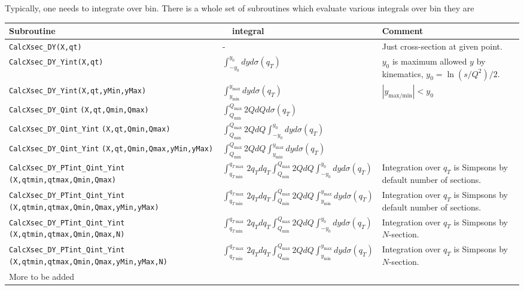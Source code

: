 \documentclass[prd,nofootinbib,eqsecnum,final]{revtex4}
\renewcommand{\(}{\left(}
\renewcommand{\)}{\right)}
\renewcommand{\[}{\left[}
\renewcommand{\]}{\right]}
\newcommand{\red}[1]{{\color[rgb]{1,0,0} #1}}
\begin{document}
Typically, one needs to integrate over bin. There is a whole set of subroutines which evaluate various integrals over bin they are
\begin{center}
\begin{tabular}{||p{7cm}|l||p{4cm}||}
\hline\hline
Subroutine & ~~integral~~&  Comment
\\\hline
\texttt{CalcXsec\_DY(X,qt)} & - & Just cross-section at given point.
\\\hline
\texttt{CalcXsec\_DY{\_}Yint(X,qt)} & $\int_{-y_{0}}^{y_{0}}dy d\sigma(q_T)$ & $y_0$ is maximum allowed $y$ by kinematics, $y_0=\ln(s/Q^2)/2$.
\\\hline
\texttt{CalcXsec\_DY{\_}Yint(X,qt,yMin,yMax)} & $\int_{y_{\min}}^{y_{\max}}dy d\sigma(q_T)$ & $|y_{\text{max/min}}|<y_0$ 
\\\hline
\texttt{CalcXsec\_DY{\_}Qint} \texttt{(X,qt,Qmin,Qmax)} & $\int_{Q_\text{min}}^{Q_{\text{max}}} 2QdQ  d\sigma(q_T)$ & 
\\\hline
\texttt{CalcXsec\_DY{\_}Qint{\_}Yint} \texttt{(X,qt,Qmin,Qmax)} & $\int_{Q_\text{min}}^{Q_{\text{max}}} 2QdQ  \int_{-y_{0}}^{y_{0}}dy d\sigma(q_T)$ & 
\\\hline
\texttt{CalcXsec\_DY{\_}Qint{\_}Yint} \texttt{(X,qt,Qmin,Qmax,yMin,yMax)} & $\int_{Q_\text{min}}^{Q_{\text{max}}} 2QdQ \int_{y_{\min}}^{y_{\max}}dy d\sigma(q_T)$ & 
\\\hline
\texttt{CalcXsec\_DY{\_}PTint{\_}Qint{\_}Yint} \texttt{(X,qtmin,qtmax,Qmin,Qmax)} & $\int_{q_{T\min}}^{q_{T\max}}2q_Tdq_T\int_{Q_\text{min}}^{Q_{\text{max}}} 2QdQ  \int_{-y_{0}}^{y_{0}}dy d\sigma(q_T)$ & Integration over $q_T$ is Simpsons by default number of sections.
\\\hline
\texttt{CalcXsec\_DY{\_}PTint{\_}Qint{\_}Yint} \texttt{(X,qtmin,qtmax,Qmin,Qmax,yMin,yMax)} & $\int_{q_{T\min}}^{q_{T\max}}2q_Tdq_T\int_{Q_\text{min}}^{Q_{\text{max}}} 2QdQ \int_{y_{\min}}^{y_{\max}}dy d\sigma(q_T)$ & Integration over $q_T$ is Simpsons by default number of sections.
\\\hline
\texttt{CalcXsec\_DY{\_}PTint{\_}Qint{\_}Yint} \texttt{(X,qtmin,qtmax,Qmin,Qmax,N)} & $\int_{q_{T\min}}^{q_{T\max}}2q_Tdq_T\int_{Q_\text{min}}^{Q_{\text{max}}} 2QdQ  \int_{-y_{0}}^{y_{0}}dy d\sigma(q_T)$ & Integration over $q_T$ is Simpsons by $N$-section.
\\\hline
\texttt{CalcXsec\_DY{\_}PTint{\_}Qint{\_}Yint} \texttt{(X,qtmin,qtmax,Qmin,Qmax,yMin,yMax,N)} & $\int_{q_{T\min}}^{q_{T\max}}2q_Tdq_T\int_{Q_\text{min}}^{Q_{\text{max}}} 2QdQ \int_{y_{\min}}^{y_{\max}}dy d\sigma(q_T)$ & Integration over $q_T$ is Simpsons by $N$-section.
\\\hline
\red{More to be added} &&
\\\hline\hline
\end{tabular}
\end{center}
\end{document}
